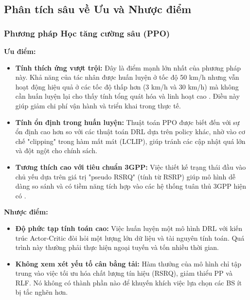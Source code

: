 \documentclass{article} %
\begin{document}
\subsection{Phân tích sâu về Ưu và Nhược điểm}
\subsubsection{Phương pháp Học tăng cường sâu (PPO)}
\textbf{Ưu điểm:}
\begin{itemize}
    \item \textbf{Tính thích ứng vượt trội:} Đây là điểm mạnh lớn nhất của phương pháp này. Khả năng của tác nhân được huấn luyện ở tốc độ 50 km/h nhưng vẫn hoạt động hiệu quả ở các tốc độ thấp hơn (3 km/h và 30 km/h) mà không cần huấn luyện lại cho thấy tính tổng quát hóa và linh hoạt cao . Điều này giúp giảm chi phí vận hành và triển khai trong thực tế.
    \item \textbf{Tính ổn định trong huấn luyện:} Thuật toán PPO được biết đến với sự ổn định cao hơn so với các thuật toán DRL dựa trên policy khác, nhờ vào cơ chế "clipping" trong hàm mất mát (LCLIP), giúp tránh các cập nhật quá lớn và đột ngột cho chính sách.
    \item \textbf{Tương thích cao với tiêu chuẩn 3GPP:} Việc thiết kế trạng thái đầu vào chủ yếu dựa trên giá trị "pseudo RSRQ" (tính từ RSRP) giúp mô hình dễ dàng so sánh và có tiềm năng tích hợp vào các hệ thống tuân thủ 3GPP hiện có .
\end{itemize}
\textbf{Nhược điểm:}
\begin{itemize}
    \item \textbf{Độ phức tạp tính toán cao:} Việc huấn luyện một mô hình DRL với kiến trúc Actor-Critic đòi hỏi một lượng lớn dữ liệu và tài nguyên tính toán. Quá trình này thường phải thực hiện ngoại tuyến và tốn nhiều thời gian.
    \item \textbf{Không xem xét yếu tố cân bằng tải:} Hàm thưởng của mô hình chỉ tập trung vào việc tối ưu hóa chất lượng tín hiệu (RSRQ), giảm thiểu PP và RLF. Nó không có thành phần nào để khuyến khích việc lựa chọn các BS ít bị tắc nghẽn hơn.
\end{itemize}
\end{document}
